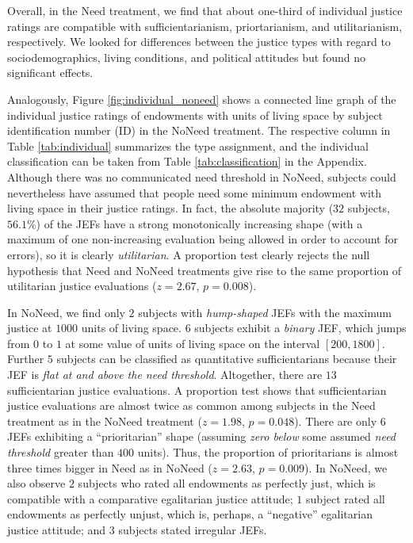 \documentclass[12pt]{scrartcl}
\begin{document}
Overall, in the Need treatment, we find that about one-third of individual justice ratings are compatible with sufficientarianism, priortarianism, and utilitarianism, respectively.
We looked for differences between the justice types with regard to sociodemographics, living conditions, and political attitudes but found no significant effects.

Analogously, Figure \ref{fig:individual_noneed} shows a connected line graph of the individual justice ratings of endowments with units of living space by subject identification number (ID) in the NoNeed treatment.
The respective column in Table \ref{tab:individual} summarizes the type assignment, and the individual classification can be taken from Table \ref{tab:classification} in the Appendix.
Although there was no communicated need threshold in NoNeed, subjects could nevertheless have assumed that people need some minimum endowment with living space in their justice ratings.
In fact, the absolute majority ($32$ subjects, $56.1\%$) of the JEFs have a strong monotonically increasing shape (with a maximum of one non-increasing evaluation being allowed in order to account for errors), so it is clearly \textit{utilitarian}.
A proportion test clearly rejects the null hypothesis that Need and NoNeed treatments give rise to the same proportion of utilitarian justice evaluations ($z=2.67$, $p=0.008$).

In NoNeed, we find only $2$ subjects with \textit{hump-shaped} JEFs with the maximum justice at $1000$ units of living space.
$6$ subjects exhibit a \textit{binary} JEF, which jumps from $0$ to $1$ at some value of units of living space on the interval $[200,1800]$.
Further $5$ subjects can be classified as quantitative sufficientarians because their JEF is \textit{flat at and above the need threshold}.
Altogether, there are $13$ sufficientarian justice evaluations.
A proportion test shows that sufficientarian justice evaluations are almost twice as common among subjects in the Need treatment as in the NoNeed treatment ($z=1.98$, $p=0.048$).
There are only $6$ JEFs exhibiting a ``prioritarian'' shape (assuming \textit{zero below} some assumed \textit{need threshold} greater than $400$ units).
Thus, the proportion of prioritarians is almost three times bigger in Need as in NoNeed ($z=2.63$, $p=0.009$).
In NoNeed, we also observe $2$ subjects who rated all endowments as perfectly just, which is compatible with a comparative egalitarian justice attitude; $1$ subject rated all endowments as perfectly unjust, which is, perhaps, a ``negative'' egalitarian justice attitude; and $3$ subjects stated irregular JEFs.
\end{document}
